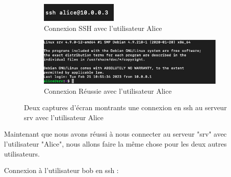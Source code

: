 \documentclass[12pt]{article}
\begin{document}
\begin{figure}[h]
  \centering
  \begin{subfigure}{0.45\textwidth}
    \centering
    \includegraphics[width=\textwidth]{Image-TD-SSH-1/SSH-Alice.png}
    \caption{Connexion SSH avec l'utilisateur Alice}
  \end{subfigure}
  \vspace{0.9cm} %
  \begin{subfigure}{0.45\textwidth}
    \centering
    \includegraphics[width=\textwidth]{Image-TD-SSH-1/Connexion-SSH-Alice.png}
    \caption{Connexion Réussie avec l'utilisateur Alice}
  \end{subfigure}
  \caption{Deux captures d'écran montrants une connexion en ssh au serveur srv avec l'utilisateur Alice}
\end{figure}

\vspace{0.3cm}

Maintenant que nous avons réussi à nous connecter au serveur "srv" avec l'utilisateur "Alice", nous allons faire la même chose pour les deux autres utilisateurs.

\vspace{0.3cm}

Connexion à l'utilisateur bob en ssh  : 

\vspace{0.3cm}
\end{document}
